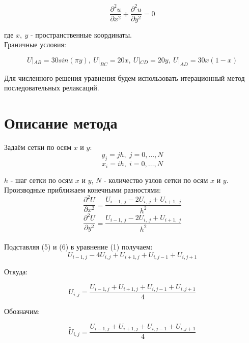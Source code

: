 \documentclass[a4paper,fontsize=14pt]{article}
\begin{document}
	\begin{equation}
	\frac{\partial^2 u}{\partial x^2} + \frac{\partial^2 u}{\partial y^2} = 0
	\end{equation}

	где $x, \: y$ - пространственные координаты.\\
	
	Граничные условия:
	
	\begin{equation}
	U|_{AB} = 30sin(\pi y), \: U|_{BC} = 20x, \: U|_{CD} = 20y, \: U|_{AD} = 30x(1-x)
	\end{equation}
	
	
	Для численного решения уравнения будем использовать итерационный метод последовательных релаксаций.

	\section{Описание метода}
	
	Задаём сетки по осям $x$ и $y$:
	\begin{equation}
		y_j = jh,\; j=0,\dots,N	
	\end{equation}
	\begin{equation}
		x_i=ih, \; i=0,\dots,N
	\end{equation}
	
	$h$ - шаг сетки по осям $x$ и $y$, $N$ - количество узлов сетки по осям $x$ и $y$. \\
	
	Производные приближаем конечными разностями: \\
	\begin{equation}
		\frac{\partial^2 U}{\partial x^2} = \frac{U_{i-1,\:j} - 2U_{i,\:j} + U_{i+1,\;j}}{h^2}
	\end{equation}
	\begin{equation}
		\frac{\partial^2 U}{\partial y^2} = \frac{U_{i-1,\:j} - 2U_{i,\:j} + U_{i+1,\;j}}{h^2}
	\end{equation} \\
	
	Подставляя (5) и (6) в уравнение (1) получаем: \\
	
	$$U_{i-1,j}-4U_{i,j}+U_{i+1,j}+U_{i,j-1}+U_{i,j+1}$$
	
	Откуда:
	
	$$U_{i,j} = \frac{U_{i-1, j} + U_{i+1, j} + U_{i, j-1} + U_{i, j+1}}{4}$$
	
	Обозначим:
	
	$$\tilde{U}_{i,j} = \frac{U_{i-1, j} + U_{i+1, j} + U_{i, j-1} + U_{i, j+1}}{4}$$
	
\end{document}
